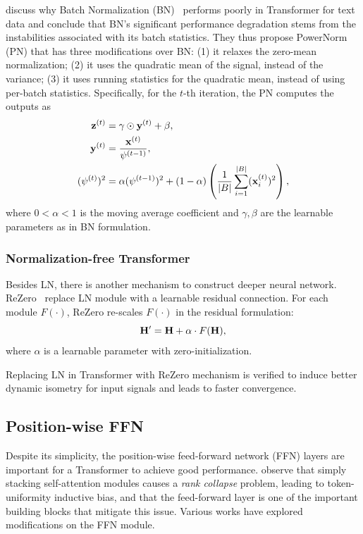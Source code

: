 \documentclass[manuscript,acmsmall,screen,nonacm]{acmart}
\theoremstyle{definition}
\begin{document}
\citet{shen2020powernorm} discuss why Batch Normalization (BN)~\cite{ioffe15batchnorm} performs poorly in Transformer for text data and conclude that BN's significant performance degradation stems from the instabilities associated with its batch statistics. They thus propose PowerNorm (PN) that has three modifications over BN: (1) it relaxes the zero-mean normalization; (2) it uses the quadratic mean
of the signal, instead of the variance; (3) it uses running statistics for the
quadratic mean, instead of using per-batch statistics. Specifically, for the $t$-th iteration, the PN computes the outputs as
\begin{align}
    \mathbf{z}^{(t)} &= \gamma\odot \mathbf{y}^{(t)}+\beta,\\
    \mathbf{y}^{(t)} &=\frac{\mathbf{x}^{(t)}}{\psi^{(t-1)}},\\
    (\psi^{(t)})^2&=\alpha(\psi^{(t-1)})^2+(1-\alpha)\left(\frac{1}{|B|}\sum_{i=1}^{|B|}(\mathbf{x}_i^{(t)})^2\right),
\end{align}
where $0<\alpha<1$ is the moving average coefficient and $\gamma, \beta$ are the learnable parameters as in BN formulation.

\subsubsection{Normalization-free Transformer}

Besides LN, there is another mechanism to construct deeper neural network. ReZero~\cite{bachlechner20rezero} replace LN module with a learnable residual connection. For each module $F(\cdot)$, ReZero re-scales $F(\cdot)$ in the residual formulation:
\begin{equation}
    \mathbf{H}'=\mathbf{H}+\alpha\cdot F(\mathbf{H}),
\end{equation}
where $\alpha$ is a learnable parameter with zero-initialization.

Replacing LN in Transformer with ReZero mechanism is verified to induce better dynamic isometry for input signals and leads to faster convergence.

\subsection{Position-wise FFN}\label{sec:ffn}

Despite its simplicity, the position-wise feed-forward network (FFN) layers are important for a Transformer to achieve good performance. \citet{dong21notallyouneed} observe that simply stacking self-attention modules causes a \textit{rank collapse} problem, leading to token-uniformity inductive bias, and that the feed-forward layer is one of the important building blocks that mitigate this issue.
Various works have explored modifications on the FFN module.
\end{document}
